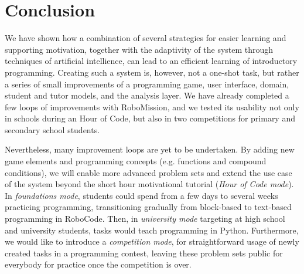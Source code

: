 \chapter{Conclusion}
\label{chap:conclusion}


We have shown how a combination of several strategies for easier learning and
supporting motivation, together with the adaptivity of the system
through techniques of artificial intellience,
can lead to an efficient learning of introductory programming. %
Creating such a system is, however, not a one-shot task, but rather a series
of small improvements of a programming game, user interface,
domain, student and tutor models, and the analysis layer.
We have already completed a few loops of improvements with
RoboMission,
and we tested its usability not only in schools during an Hour of Code,
but also in two competitions for primary and secondary school students. %



Nevertheless, many improvement loops are yet to be undertaken. By adding
new game elements and programming concepts (e.g. functions and compound
conditions), we will enable more advanced problem sets and extend the use
case of the system beyond the short hour motivational tutorial (\emph{Hour of Code mode}).  %
In \emph{foundations mode}, students could spend from a few days to several weeks practicing
programming, transitioning gradually from block-based to text-based programming
in RoboCode.
Then, in \emph{university mode} targeting at high school and university students,
tasks would teach programming in Python.
Furthermore, we would like to introduce a \emph{competition mode}, for
straightforward usage of newly created tasks in a programming contest,
leaving these problem sets public for everybody for practice once the
competition is over.

